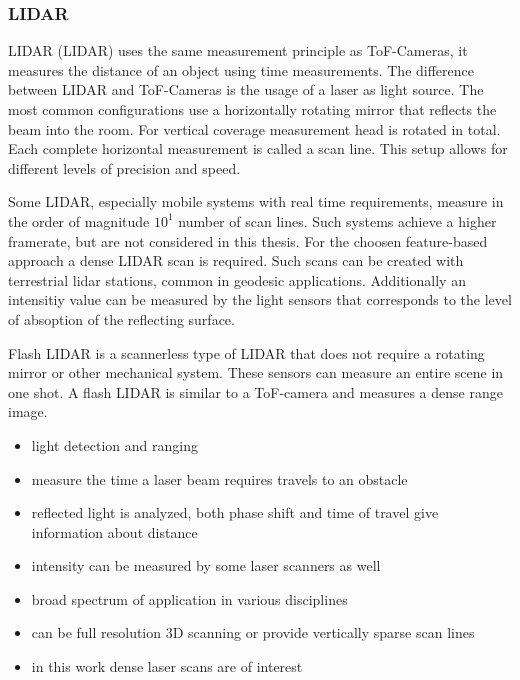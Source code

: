 \subsubsection{\acrlong{LIDAR}}

\acrlong{LIDAR} (\acrshort{LIDAR}) uses the same measurement principle as \acrshort{ToF}-Cameras, it measures the distance of an object using time measurements.
The difference between \acrshort{LIDAR} and \acrshort{ToF}-Cameras is the usage of a \acrshort{laser} as light source.
The most common configurations use a horizontally rotating mirror that reflects the beam into the room.
For vertical coverage measurement head is rotated in total.
Each complete horizontal measurement is called a scan line.
This setup allows for different levels of precision and speed.

Some \acrshort{LIDAR}, especially mobile systems with real time requirements, measure in the order of magnitude $10^1$ number of scan lines.
Such systems achieve a higher framerate, but are not considered in this thesis.
For the choosen feature-based approach a dense \acrshort{LIDAR} scan is required.
Such scans can be created with terrestrial lidar stations, common in geodesic applications.
Additionally an intensitiy value can be measured by the light sensors that corresponds to the level of absoption of the reflecting surface.

Flash \acrshort{LIDAR} is a scannerless type of \acrshort{LIDAR} that does not require a rotating mirror or other mechanical system.
These sensors can measure an entire scene in one shot.
A flash \acrshort{LIDAR} is similar to a \acrshort{ToF}-camera and measures a dense range image.

\begin{itemize}
    \item light detection and ranging
    \item measure the time a laser beam requires travels to an obstacle
    \item reflected light is analyzed, both phase shift and time of travel give information about distance
    \item intensity can be measured by some laser scanners as well
    \item broad spectrum of application in various disciplines
    \item can be full resolution 3D scanning or provide vertically sparse scan lines
    \item in this work dense laser scans are of interest
\end{itemize}

